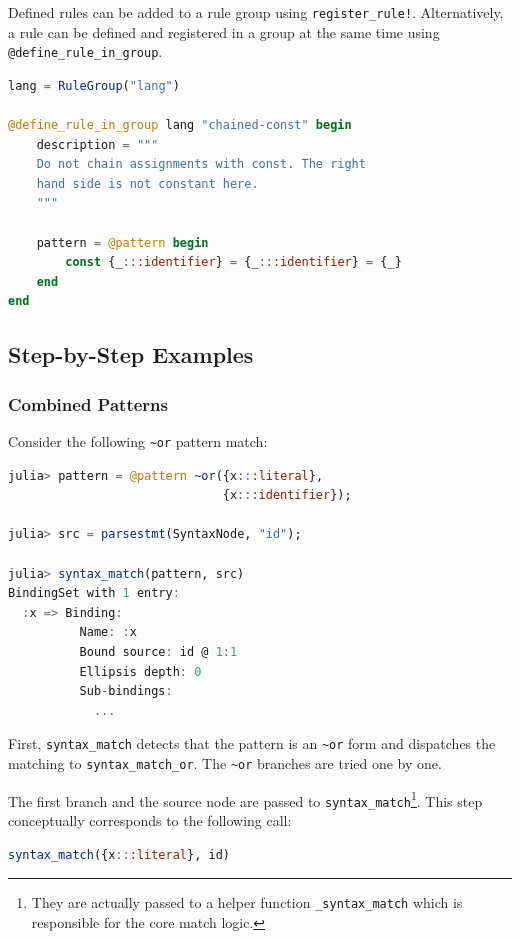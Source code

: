 \documentclass{juliacon}
\begin{document}
Defined rules can be added to a rule group using
\texttt{register\_rule!}. Alternatively, a rule can be defined and registered
in a group at the same time using \texttt{@define\_rule\_in\_group}.

\begin{lstlisting}[language=julia]
lang = RuleGroup("lang")

@define_rule_in_group lang "chained-const" begin
    description = """
    Do not chain assignments with const. The right
    hand side is not constant here.
    """

    pattern = @pattern begin
        const {_:::identifier} = {_:::identifier} = {_}
    end
end
\end{lstlisting}

\subsection{Step-by-Step Examples}
\label{sec:org86e7540}

\subsubsection{Combined Patterns}
\label{sec:org1890b92}

Consider the following \texttt{\textasciitilde{}or} pattern match:

\begin{lstlisting}[language=julia]
julia> pattern = @pattern ~or({x:::literal},
                              {x:::identifier});

julia> src = parsestmt(SyntaxNode, "id");

julia> syntax_match(pattern, src)
BindingSet with 1 entry:
  :x => Binding:
          Name: :x
          Bound source: id @ 1:1
          Ellipsis depth: 0
          Sub-bindings:
            ...
\end{lstlisting}

First, \texttt{syntax\_match} detects that the pattern is an \texttt{\textasciitilde{}or} form and
dispatches the matching to \texttt{syntax\_match\_or}. The \texttt{\textasciitilde{}or} branches are
tried one by one.

The first branch and the source node are passed to
\texttt{syntax\_match}\footnote{They are actually passed to a helper function \texttt{\_syntax\_match}
which is responsible for the core match logic.}. This step conceptually corresponds to the
following call:

\begin{lstlisting}[language=julia]
syntax_match({x:::literal}, id)
\end{lstlisting}
\end{document}
